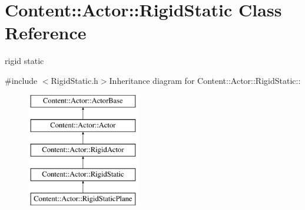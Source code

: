 \hypertarget{classContent_1_1Actor_1_1RigidStatic}{
\section{Content::Actor::RigidStatic Class Reference}
\label{classContent_1_1Actor_1_1RigidStatic}
}


rigid static  


{\ttfamily \#include $<$RigidStatic.h$>$}Inheritance diagram for Content::Actor::RigidStatic::\begin{figure}[H]
\begin{center}
\leavevmode
\includegraphics[height=5cm]{classContent_1_1Actor_1_1RigidStatic}
\end{center}
\end{figure}
